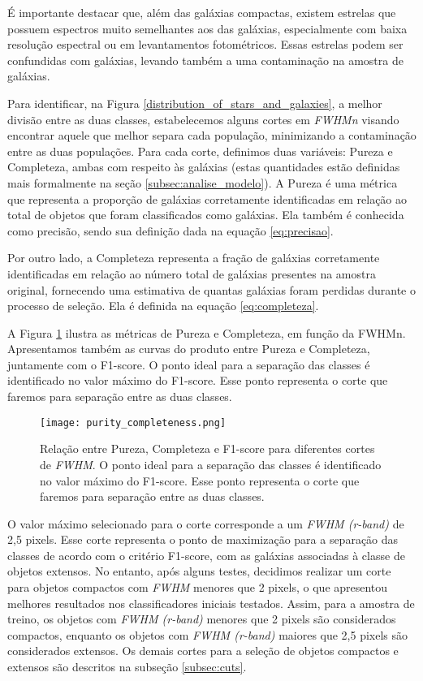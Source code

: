É importante destacar que, além das galáxias compactas, existem estrelas que possuem espectros muito semelhantes aos das galáxias, especialmente com baixa resolução espectral ou em levantamentos fotométricos. Essas estrelas podem ser confundidas com galáxias, levando também a uma contaminação na amostra de galáxias.

Para identificar, na Figura \ref{distribution_of_stars_and_galaxies}, a melhor divisão entre as duas classes, estabelecemos alguns cortes em \textit{FWHMn} visando encontrar aquele que melhor separa cada população, minimizando a contaminação entre as duas populações. Para cada corte, definimos duas variáveis: Pureza e Completeza, ambas com respeito às galáxias (estas quantidades estão definidas mais formalmente na seção \ref{subsec:analise_modelo}). A Pureza é uma métrica que representa a proporção de galáxias corretamente identificadas em relação ao total de objetos que foram classificados como galáxias. Ela também é conhecida como precisão, sendo sua definição dada na equação \ref{eq:precisao}.

Por outro lado, a Completeza representa a fração de galáxias corretamente identificadas em relação ao número total de galáxias presentes na amostra original, fornecendo uma estimativa de quantas galáxias foram perdidas durante o processo de seleção. Ela é definida na equação \ref{eq:completeza}.

A Figura \ref{purity_completeness} ilustra as métricas de Pureza e Completeza, em função da FWHMn. Apresentamos também as curvas do produto entre Pureza e Completeza, juntamente com o F1-score. O ponto ideal para a separação das classes é identificado no valor máximo do F1-score. Esse ponto representa o corte que faremos para separação entre as duas classes.

\begin{figure}[!ht]
    \centering
    \texttt{[image: purity\_completeness.png]}
    \caption[]{Relação entre Pureza, Completeza e F1-score para diferentes cortes de \textit{FWHM}. O ponto ideal para a separação das classes é identificado no valor máximo do F1-score. Esse ponto representa o corte que faremos para separação entre as duas classes.}
    \label{purity_completeness}
\end{figure}

O valor máximo selecionado para o corte corresponde a um \textit{FWHM (r-band)} de 2,5 pixels. Esse corte representa o ponto de maximização para a separação das classes de acordo com o critério F1-score, com as galáxias associadas à classe de objetos extensos. No entanto, após alguns testes, decidimos realizar um corte para objetos compactos com \textit{FWHM} menores que 2 pixels, o que apresentou melhores resultados nos classificadores iniciais testados. Assim, para a amostra de treino, os objetos com \textit{FWHM (r-band)} menores que 2 pixels são considerados compactos, enquanto os objetos com \textit{FWHM (r-band)} maiores que 2,5 pixels são considerados extensos. Os demais cortes para a seleção de objetos compactos e extensos são descritos na subseção \ref{subsec:cuts}.

